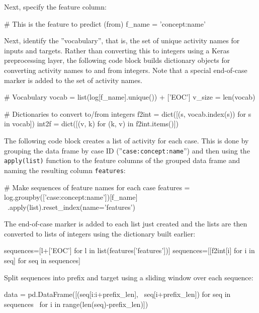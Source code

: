Next, specify the feature column:

\begin{pythoncode}
# This is the feature to predict (from)
f_name = 'concept:name'
\end{pythoncode}

Next, identify the ''vocabulary'', that is, the set of unique activity names for inputs and targets. Rather than converting this to integers using a Keras preprocessing layer, the following code block builds dictionary objects for converting activity names to and from integers. Note that a special end-of-case marker is added to the set of activity names.

\begin{samepage}
\begin{pythoncode}
# Vocabulary
vocab = list(log[f_name].unique()) + ['EOC']
v_size = len(vocab)

# Dictionaries to convert to/from integers
f2int = dict([(s, vocab.index(s)) for s in vocab])
int2f = dict([(v, k) for (k, v) in f2int.items()])
\end{pythoncode}
\end{samepage}

The following code block creates a list of activity for each case. This is done by grouping the data frame by case ID (''\texttt{case:concept:name}'') and then using the \texttt{apply(list)} function to the feature columns of the grouped data frame and naming the resulting column \texttt{features}:

\begin{samepage}
\begin{pythoncode}
# Make sequences of feature names for each case
features = log.groupby(['case:concept:name'])[f_name] \
    .apply(list).reset_index(name='features')
\end{pythoncode}
\end{samepage}

The end-of-case marker is added to each list just created and the lists are then converted to lists of integers using the dictionary built earlier:

\begin{samepage}
\begin{pythoncode}
sequences=[l+['EOC'] for l in list(features['features'])]
sequences=[[f2int[i] for i in seq] for seq in sequences]
\end{pythoncode}
\end{samepage}

Split sequences into prefix and target using a sliding window over each sequence:
\begin{samepage}
\begin{pythoncode}
data = pd.DataFrame([(seq[i:i+prefix_len], \
    seq[i+prefix_len]) for seq in sequences \
    for i in range(len(seq)-prefix_len)])
\end{pythoncode}
\end{samepage}

